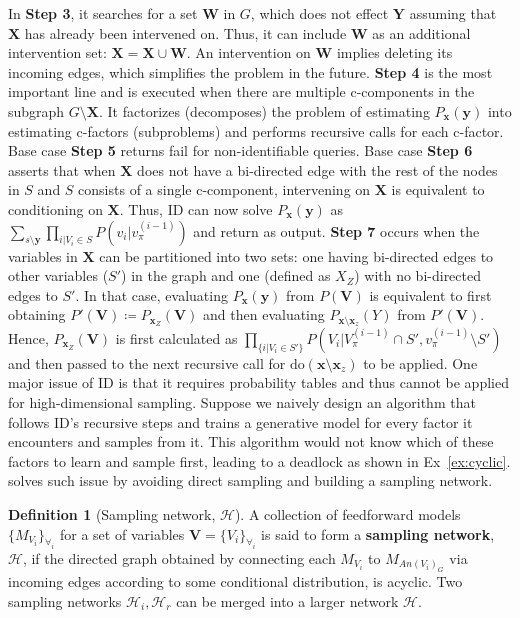 \documentclass{article}
\newcommand{\h}{\mathcal{H}}
\newcommand{\x}{\mathbf{x}}
\newcommand{\X}{\mathbf{X}}
\newcommand{\Y}{\mathbf{Y}}
\newcommand{\V}{\mathbf{V}}
\newcommand{\mbf}{\mathbf}
\newcommand{\Do}{\text{do}}
\newcommand{\idgen}{\text{ID-GEN}\xspace}
\newcommand{\ydox}{P_{\mathbf{x}}(\mathbf{y})\xspace}
\theoremstyle{plain}
\theoremstyle{definition}
\newtheorem{definition}[theorem]{Definition}
\theoremstyle{remark}
\begin{document}
In \textbf{Step 3}, it searches for a set $\mathbf{W}$ in $G$, which does not effect $\Y$ assuming that $\X$ has already been intervened on. Thus, it can include $\mathbf{W}$ as an additional intervention set: $\X=\X \cup \mathbf{W}$. An intervention on $\mathbf{W}$ implies deleting its incoming edges, which simplifies the problem in the future.
\textbf{Step 4} is the most important line and is executed when there are multiple c-components in the subgraph $G\setminus \X$.
It factorizes (decomposes) the problem of estimating $\ydox$ into estimating c-factors (subproblems) and performs recursive calls  for each c-factor.
%
Base case \textbf{Step 5} returns fail for non-identifiable queries.
Base case \textbf{Step 6} asserts that when $\X$ does not have a bi-directed edge with the rest of the nodes in $S$ and $S$ consists of a single c-component, intervening on $\X$ is equivalent to conditioning on $\X$. Thus, ID can now solve $\ydox$ as $\sum_{s\setminus \mbf{y}} \prod_{i|V_i\in S} P(v_i|v_{\pi}^{(i-1)})$ and return as output.
 \textbf{Step 7} occurs when the variables in $\X$ can be partitioned into two sets: one having bi-directed edges to other variables ($S'$) in the graph and one (defined as $X_Z$) with no bi-directed edges to $S'$. In that case, evaluating $\ydox$ from $P(\V)$ is equivalent to first obtaining $P'(\V)\coloneqq P_{\x_Z}(\V)$ and then evaluating $P_{\x \setminus \x_z}(Y)$ from $P'(\V)$. Hence, $P_{\x_Z}(\V)$ is first calculated as $\prod_{\{i | V_{i} \in S'\}}P(V_{i}| V_{\pi}^{(i-1)}\cap S', v_{\pi}^{(i-1)}\setminus S')$ and then passed to the next recursive call for $\Do(\x \setminus \x_z)$ to be applied.
%
%
%
%
One major issue of  ID is that it requires probability tables and thus cannot be applied for high-dimensional sampling.
Suppose we naively design an algorithm that follows ID's recursive steps and trains a generative model for every factor it encounters and samples from it. This algorithm would not know which of these factors
to learn and sample first, leading to a deadlock as shown in Ex~\ref{ex:cyclic}.
\idgen solves such issue by avoiding direct sampling and building a sampling network.
%
%
%
%
%
  \begin{definition}[Sampling network, $\h$]
A collection of feedforward models $\{M_{V_i}\}_{\forall_i}$ for a set of variables $\mbf{V}=\{V_i\}_{\forall_i}$ is said to form a \textbf{sampling network}, $\h$, if the directed graph obtained by connecting each $M_{V_i}$ to $M_{An(V_i)_{G}}$ via incoming edges according to some conditional distribution, is acyclic. 
Two sampling networks $\h_i, \h_r$ can be merged into a larger network $\h$.
	\end{definition}
%
%
%
%
\end{document}
